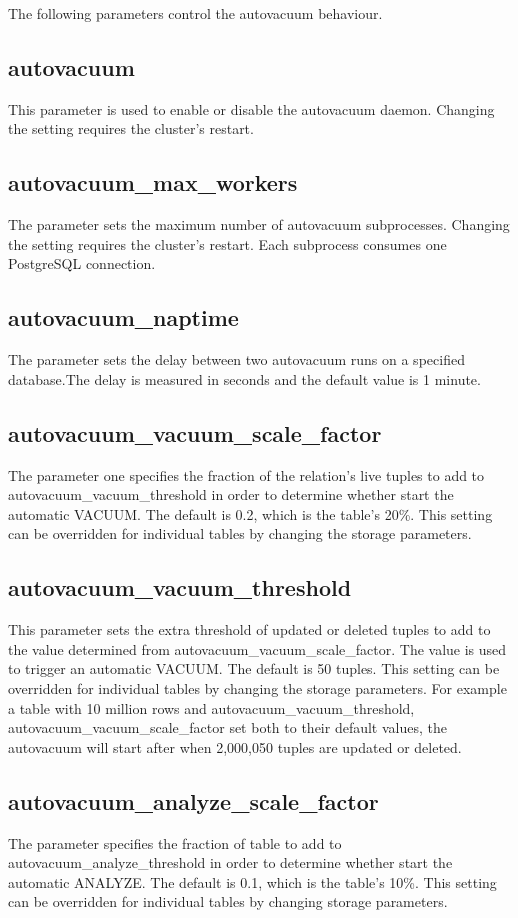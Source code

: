 The following parameters control the autovacuum behaviour.

\subsection{autovacuum} 
This parameter is used to enable or disable the autovacuum daemon. Changing the setting requires 
the cluster's restart. 

\subsection{autovacuum\_max\_workers} 
The parameter sets the maximum number of autovacuum subprocesses. Changing the setting requires the 
cluster's restart. Each subprocess consumes one PostgreSQL connection.

\subsection{autovacuum\_naptime} 
The parameter sets the delay between two autovacuum runs on a specified database.The delay is 
measured in seconds and the default value is 1 minute.

\subsection{autovacuum\_vacuum\_scale\_factor}
The parameter one specifies the fraction of the relation's live tuples to add to 
autovacuum\_vacuum\_threshold in order to determine whether start the automatic VACUUM. The default is 0.2, 
which is the table's 20\%. This setting can be overridden for individual tables by changing the storage 
parameters.

\subsection{autovacuum\_vacuum\_threshold}
This parameter sets the extra threshold of updated or deleted tuples to add to the value determined 
from autovacuum\_vacuum\_scale\_factor. The value is used to trigger an automatic VACUUM. The default is 50 
tuples. This setting can be overridden for individual tables by changing the storage parameters. For 
example a table with 10 million rows and autovacuum\_vacuum\_threshold, autovacuum\_vacuum\_scale\_factor 
set both to their default values, the autovacuum will start after when 2,000,050 tuples are updated or 
deleted.

\subsection{autovacuum\_analyze\_scale\_factor}
The parameter specifies the fraction of table to add to autovacuum\_analyze\_threshold in order to determine 
whether start the automatic ANALYZE. The default is 0.1, which is the table's 10\%. This setting can be 
overridden for individual tables by changing storage parameters.

